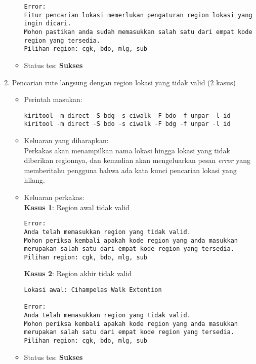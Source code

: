 \begin{enumerate}
\begin{itemize}
\begin{lstlisting}
Error:
Fitur pencarian lokasi memerlukan pengaturan region lokasi yang ingin dicari.
Mohon pastikan anda sudah memasukkan salah satu dari empat kode region yang tersedia.
Pilihan region: cgk, bdo, mlg, sub
		\end{lstlisting}
		\item Status tes: \textbf{Sukses}
	\end{itemize}
	
	\item Pencarian rute langsung dengan region lokasi yang tidak valid (2 kasus)
	\begin{itemize}
		\item Perintah masukan:
		\begin{verbatim}
kiritool -m direct -S bdg -s ciwalk -F bdo -f unpar -l id
kiritool -m direct -S bdo -s ciwalk -F bdg -f unpar -l id
		\end{verbatim}
		\item Keluaran yang diharapkan: \\
		Perkakas akan menampilkan nama lokasi hingga lokasi yang tidak diberikan regionnya, dan kemudian akan mengeluarkan pesan \textit{error} yang memberitahu pengguna bahwa ada kata kunci pencarian lokasi yang hilang.
		\item Keluaran perkakas: \\
		\textbf{Kasus 1}: Region awal tidak valid
		\begin{lstlisting}
Error:
Anda telah memasukkan region yang tidak valid.
Mohon periksa kembali apakah kode region yang anda masukkan merupakan salah satu dari empat kode region yang tersedia.
Pilihan region: cgk, bdo, mlg, sub
		\end{lstlisting}
		\textbf{Kasus 2}: Region akhir tidak valid
		\begin{lstlisting}
Lokasi awal: Cihampelas Walk Extention

Error:
Anda telah memasukkan region yang tidak valid.
Mohon periksa kembali apakah kode region yang anda masukkan merupakan salah satu dari empat kode region yang tersedia.
Pilihan region: cgk, bdo, mlg, sub
		\end{lstlisting}
		\item Status tes: \textbf{Sukses}
	\end{itemize}
	

\end{enumerate}
